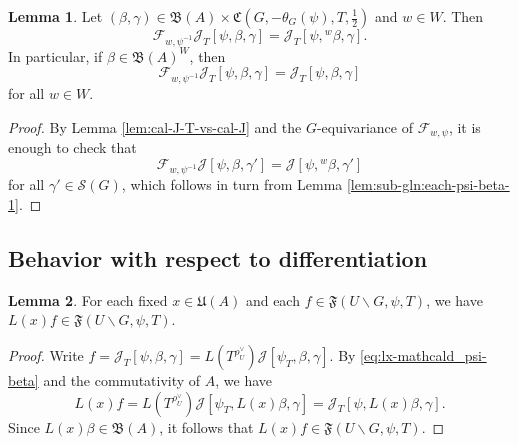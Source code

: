 \documentclass[reqno]{amsart}
\theoremstyle{plain} \newtheorem{theorem} {Theorem}
\theoremstyle{definition} \newtheorem{definition} [theorem] {Definition}
\theoremstyle{itplain} %
\newtheorem{lemma}[theorem]{Lemma}
\numberwithin{equation}{section}
\numberwithin{theorem}{section}
\begin{document}
\begin{lemma}\label{lem:each-f-in}
  Let $(\beta,\gamma) \in \mathfrak{B}(A) \times \mathfrak{C}(G,-\theta_G(\psi),T,\tfrac{1}{2})$ and $w \in W$.  Then
  \begin{equation*}
    \mathcal{F}_{w,\psi ^{-1} } \mathcal{J}_T[\psi,\beta,\gamma]
    = \mathcal{J}_T[\psi,{}^w \beta, \gamma].
  \end{equation*}
  In particular, if $\beta \in \mathfrak{B}(A)^W$, then
  \begin{equation*}
    \mathcal{F}_{w,\psi ^{-1} } \mathcal{J}_T[\psi,\beta,\gamma]
    = \mathcal{J}_T[\psi,\beta,\gamma]
  \end{equation*}
  for all $w \in W$.
\end{lemma}
\begin{proof}
  By Lemma \ref{lem:cal-J-T-vs-cal-J} and the $G$-equivariance of $\mathcal{F}_{w,\psi}$, it is enough to check that
  \begin{equation*}
    \mathcal{F}_{w,\psi ^{-1}} \mathcal{J}[\psi,\beta, \gamma' ]
    =
    \mathcal{J}[{\psi,{}^w \beta, \gamma' }]
  \end{equation*}
  for all $\gamma ' \in \mathcal{S}(G)$, which follows in turn from Lemma \ref{lem:sub-gln:each-psi-beta-1}.
\end{proof}




\subsection{Behavior with respect to differentiation}


\begin{lemma}\label{lem:standard:each-fixed-x}
  For each fixed $x \in \mathfrak{U}(A)$ and each $f \in \mathfrak{F}(U \backslash G, \psi, T)$, we have $L(x) f \in \mathfrak{F}(U \backslash G, \psi, T)$.
\end{lemma}
\begin{proof}
  Write $f = \mathcal{J}_T[\psi,\beta,\gamma] = L(T^{\rho_U^\vee}) \mathcal{J}[\psi_T,\beta,\gamma]$.  By \eqref{eq:lx-mathcald_psi-beta} and the commutativity of $A$, we have
  \begin{equation*}
    L(x) f = L(T^{\rho_U^\vee}) \mathcal{J}[\psi_T, L(x) \beta, \gamma] = \mathcal{J}_T[\psi,L(x) \beta,\gamma].
  \end{equation*}
  Since $L(x) \beta \in \mathfrak{B}(A)$, it follows that $L(x) f \in \mathfrak{F}(U \backslash G, \psi, T)$.
\end{proof}
\end{document}
